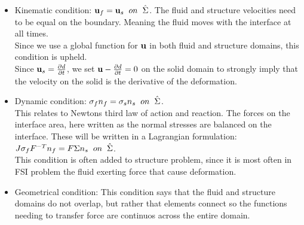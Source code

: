 \begin{itemize}
\item Kinematic condition: $\bold{u}_f = \bold{u}_s  \hspace{2mm} on \hspace{2mm} \hat{\Sigma}$. The fluid and structure velocities need to be equal on the boundary. Meaning the fluid moves with the interface at all times. \\
Since we use a global function for $\bold{u}$ in both fluid and structure domains, this condition is upheld.\\
Since $ \bold{u}_s = \frac{\partial d}{\partial t} $, we set  $\bold{u} - \frac{\partial d}{\partial t}  = 0  $ on the solid domain to strongly imply that the velocity on the solid is the derivative of the deformation.  

\item Dynamic condition: $  \sigma_f n_f = \sigma_s n_s \hspace{2mm} on  \hspace{2mm}\hat{\Sigma}   $. \\
	This relates to Newtons third law of action and reaction. The forces on the interface area, here written as the normal stresses are balanced on the interface. These will be written in a Lagrangian formulation: \\
	$J\sigma_f F^{-T} n_f = F\Sigma n_s \hspace{2mm} on  \hspace{2mm}\hat{\Sigma} $. \\
	This condition is often added to structure problem, since it is most often in FSI problem the fluid exerting force that cause deformation.
\item Geometrical condition: This condition says that the fluid and structure domains do not overlap, but rather that elements connect so the functions needing to transfer force are continuos across the entire domain.
\end{itemize}

